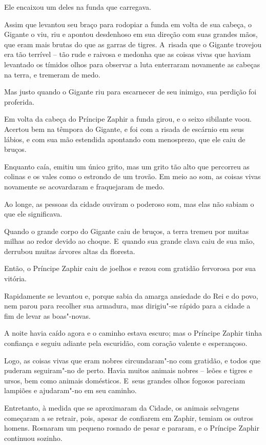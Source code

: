 Ele encaixou um deles na funda que carregava.

Assim que levantou seu braço para rodopiar a funda em volta de sua
cabeça, o Gigante o viu, riu e apontou desdenhoso em sua direção com
suas grandes mãos, que eram mais brutas do que as garras de tigres. A~risada que o Gigante trovejou era tão terrível -- tão rude e raivosa e
medonha que as coisas vivas que haviam levantado os tímidos olhos para
observar a luta enterraram novamente as cabeças na terra, e tremeram de
medo.

Mas justo quando o Gigante riu para escarnecer de seu inimigo, sua
perdição foi proferida.

Em volta da cabeça do Príncipe Zaphir a funda girou, e o seixo sibilante
voou. Acertou bem na têmpora do Gigante, e foi com a risada de escárnio
em seus lábios, e com sua mão estendida apontando com menosprezo, que
ele caiu de bruços.

Enquanto caía, emitiu um único grito, mas um grito tão alto que
percorreu as colinas e os vales como o estrondo de um trovão. Em meio ao
som, as coisas vivas novamente se acovardaram e fraquejaram de medo.

\smallskip
Ao longe, as pessoas da cidade ouviram o poderoso som, mas elas não
sabiam o que ele significava.

Quando o grande corpo do Gigante caiu de bruços, a terra tremeu por
muitas milhas ao redor devido ao choque. E~quando sua grande clava caiu
de sua mão, derrubou muitas árvores altas da floresta.

Então, o Príncipe Zaphir caiu de joelhos e rezou com gratidão fervorosa
por sua vitória.

Rapidamente se levantou e, porque sabia da amarga ansiedade do Rei e do
povo, nem parou para recolher sua armadura, mas dirigiu"-se rápido para a
cidade a fim de levar as boas"-novas.

A noite havia caído agora e o caminho estava escuro; mas o Príncipe
Zaphir tinha confiança e seguiu adiante pela escuridão, com coração
valente e esperançoso.

Logo, as coisas vivas que eram nobres circundaram"-no com gratidão, e
todos que puderam seguiram"-no de perto. Havia muitos animais nobres --
leões e tigres e ursos, bem como animais domésticos. E~seus grandes
olhos fogosos pareciam lampiões e ajudaram"-no em seu caminho.

Entretanto, à medida que se aproximaram da Cidade, os animais selvagens
começaram a se retrair, pois, apesar de confiarem em Zaphir, temiam os
outros homens. Rosnaram um pequeno rosnado de pesar e pararam, e o
Príncipe Zaphir continuou sozinho.

